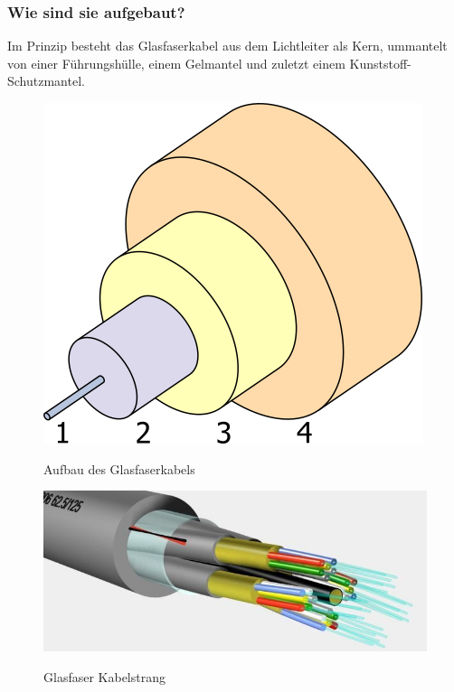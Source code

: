\subsubsection*{Wie sind sie aufgebaut?}
Im Prinzip besteht das Glasfaserkabel aus dem Lichtleiter als Kern, ummantelt von einer Führungshülle, einem Gelmantel und zuletzt einem Kunststoff-Schutzmantel.

\begin{multicols*}{2}
    \begin{figure}[H]
        \begin{center}
            \label{pic:OpticalFiber}
            \includegraphics[width=.5\textwidth]{images/optical_fibre_structure.png}
            \caption{Aufbau des Glasfaserkabels\cite{wiki}}
        \end{center}
    \end{figure}
    \columnbreak
    \begin{figure}[H]
        \begin{center}
        \label{pic:OpticalCable}
        \includegraphics[width=.5\textwidth]{images/optical_cable.jpg}
        \caption{Glasfaser Kabelstrang\cite{wiki}}
        \end{center}
    \end{figure}
\end{multicols*}


